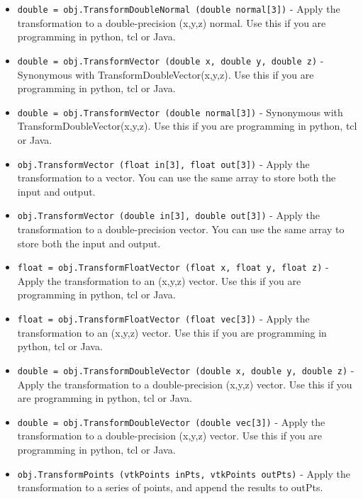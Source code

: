 \begin{itemize}
\item  \verb|double = obj.TransformDoubleNormal (double normal[3])| -  Apply the transformation to a double-precision (x,y,z) normal.
 Use this if you are programming in python, tcl or Java.

\item  \verb|double = obj.TransformVector (double x, double y, double z)| -  Synonymous with TransformDoubleVector(x,y,z).
 Use this if you are programming in python, tcl or Java.

\item  \verb|double = obj.TransformVector (double normal[3])| -  Synonymous with TransformDoubleVector(x,y,z).
 Use this if you are programming in python, tcl or Java.

\item  \verb|obj.TransformVector (float in[3], float out[3])| -  Apply the transformation to a vector.
 You can use the same array to store both the input and output.

\item  \verb|obj.TransformVector (double in[3], double out[3])| -  Apply the transformation to a double-precision vector.
 You can use the same array to store both the input and output.

\item  \verb|float = obj.TransformFloatVector (float x, float y, float z)| -  Apply the transformation to an (x,y,z) vector.
 Use this if you are programming in python, tcl or Java.

\item  \verb|float = obj.TransformFloatVector (float vec[3])| -  Apply the transformation to an (x,y,z) vector.
 Use this if you are programming in python, tcl or Java.

\item  \verb|double = obj.TransformDoubleVector (double x, double y, double z)| -  Apply the transformation to a double-precision (x,y,z) vector.
 Use this if you are programming in python, tcl or Java.

\item  \verb|double = obj.TransformDoubleVector (double vec[3])| -  Apply the transformation to a double-precision (x,y,z) vector.
 Use this if you are programming in python, tcl or Java.

\item  \verb|obj.TransformPoints (vtkPoints inPts, vtkPoints outPts)| -  Apply the transformation to a series of points, and append the
 results to outPts.  


\end{itemize}
